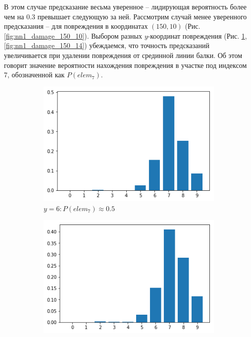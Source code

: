 \documentclass[a4paper,12pt]{article}
\theoremstyle{remark}
\begin{document}
	В этом случае предсказание весьма уверенное -- лидирующая вероятность более чем на 0.3 превышает следующую за ней. Рассмотрим случай менее уверенного предсказания -- для повреждения в координатах $(150, 10)$ (Рис. \ref{fig:nn1_damage_150_10}). Выбором разных $y$-координат повреждения (Рис. \ref{fig:nn1_damage_150_6}, \ref{fig:nn1_damage_150_14}) убеждаемся, что точность предсказаний увеличивается при удалении повреждения от срединной линии балки. Об этом говорит значение вероятности нахождения повреждения в участке под индексом 7, обозначенной как $P(elem_7)$.
	\begin{figure}[h]
		\begin{subfigure}{0.33\textwidth}
			\includegraphics[width=\linewidth]{nn1_damage_150_6.png}
			\caption{$y=6: P(elem_7)\approx0.5$}
			\label{fig:nn1_damage_150_6}
		\end{subfigure}
		\begin{subfigure}{0.33\textwidth}
			\includegraphics[width=\linewidth]{nn1_damage_150_10.png}

\end{subfigure}
\end{figure}
\end{document}
